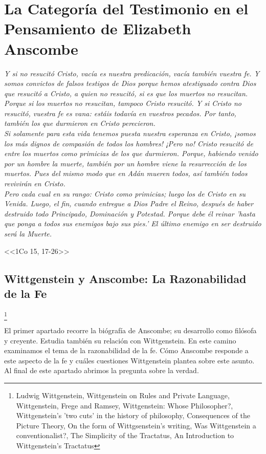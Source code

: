 \documentclass[../main.tex]{subfiles}
\begin{document}
\chapter*{La Categoría del Testimonio en el Pensamiento de Elizabeth Anscombe}
\emph{Y si no resucitó Cristo, vacía es nuestra predicación, vacía también vuestra fe. 
Y somos convictos de falsos testigos de Dios porque hemos atestiguado contra Dios que resucitó a Cristo, a quien no resucitó, si es que los muertos no resucitan.
Porque si los muertos no resucitan, tampoco Cristo resucitó.
Y si Cristo no resucitó, vuestra fe es vana: estáis todavía en vuestros pecados.
Por tanto, también los que durmieron en Cristo perecieron.\\
Si solamente para esta vida tenemos puesta nuestra esperanza en Cristo, ¡somos los más dignos de compasión de todos los hombres!
¡Pero no! Cristo resucitó de entre los muertos como primicias de los que durmieron.
Porque, habiendo venido por un hombre la muerte, también por un hombre viene la resurrección de los muertos.
Pues del mismo modo que en Adán mueren todos, así también todos revivirán en Cristo.\\
Pero cada cual en su rango: Cristo como primicias; luego los de Cristo en su Venida.
Luego, el fin, cuando entregue a Dios Padre el Reino, después de haber destruido todo Principado, Dominación y Potestad.
Porque debe él reinar 'hasta que ponga a todos sus enemigos bajo sus pies.'
El último enemigo en ser destruido será la Muerte.}

<<1Co 15, 17-26>>


\section{Wittgenstein y Anscombe: La Razonabilidad de la Fe}
\footnote{
Ludwig Wittgenstein, 
Wittgenstein on Rules and Private Language, 
Wittgenstein, Frege and Ramsey, 
Wittgenstein: Whose Philosopher?, 
Wittgenstein's 'two cuts' in the history of philosophy, 
Consequences of the Picture Theory, 
On the form of Wittgsenstein's writing, 
Was Wittgenstein a conventionalist?, 
The Simplicity of the Tractatus, 
An Introduction to Wittgenstein's Tractatus
}

El primer apartado recorre la biógrafía de Anscombe; su desarrollo como filósofa y creyente. Estudia también su relación con Wittgenstein. En este camino examinamos el tema de la razonabilidad de la fe. Cómo Anscombe responde a este aspecto de la fe y cuáles cuestiones Wittgenstein plantea sobre este asunto. Al final de este apartado abrimos la pregunta sobre la verdad.
\end{document}
